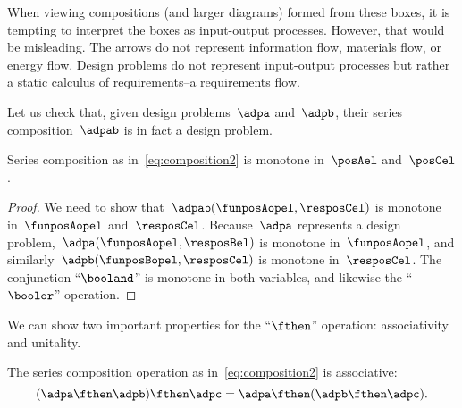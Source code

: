 \begin{remark}
	When viewing compositions (and larger diagrams) formed from these boxes, it is tempting to interpret the boxes as input-output processes.
	However, that would be misleading.
	The arrows do not represent information flow, materials flow, or energy flow.
	Design problems do not represent input-output processes but rather a static calculus of requirements--a requirements flow.
\end{remark}

Let us check that, given design problems~$\adpa$ and~$\adpb$, their series composition~$\adpab$ is in fact a design problem.
\begin{lemma}
	Series composition as in~\cref{eq:composition2} is monotone in~$\posAel$ and~$\posCel$.
\end{lemma}
\begin{proof}
	We need to show that~$\adpab(\funposAopel,\resposCel)$ is monotone in~$\funposAopel$ and~$\resposCel$.
	Because~$\adpa$ represents a design problem,~$\adpa(\funposAopel,\resposBel)$ is monotone in~$\funposAopel$, and similarly~$\adpb(\funposBopel,\resposCel)$ is monotone in~$\resposCel$.
	The conjunction ``$\booland$'' is monotone in both variables, and likewise the ``$\boolor$'' operation.
\end{proof}

We can show two important properties for the ``$\fthen$'' operation: associativity and unitality.
\begin{lemma}
	The series composition operation as in~\cref{eq:composition2} is associative:
	\begin{equation}
		(\adpa\fthen \adpb)
		\fthen \adpc = \adpa\fthen (\adpb\fthen \adpc).
	\end{equation}
\end{lemma}

